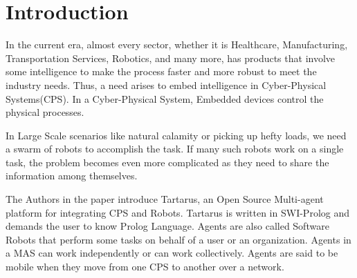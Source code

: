 \chapter{Introduction}  \label{Introduction}

\large
In the current era, almost every sector, whether it is Healthcare, Manufacturing, Transportation Services, Robotics, and many more, has products that involve some intelligence to make the process faster and more robust to meet the industry needs. Thus, a need arises to embed intelligence in Cyber-Physical Systems(CPS). In a Cyber-Physical System, Embedded devices control the physical processes.
\par

\bigbreak
In Large Scale scenarios like natural calamity or picking up hefty loads, we need a swarm of robots to accomplish the task. If many such robots work on a single task, the problem becomes even more complicated as they need to share the information among themselves. \par

\bigbreak
The Authors in the paper \cite{semwal2015tartarus} introduce Tartarus, an Open Source Multi-agent platform for integrating CPS and Robots. Tartarus is written in SWI-Prolog\cite{wielemaker_schrijvers_triska_lager_2012} and demands the user to know Prolog Language. Agents are also called Software Robots that perform some tasks on behalf of a user or an organization. Agents\cite{10.1007/3-540-45982-0_1} in a MAS can work independently or can work collectively. Agents are said to be mobile\cite{10.1007/3-540-62852-5_4} when they move from one CPS to another over a network.\par

